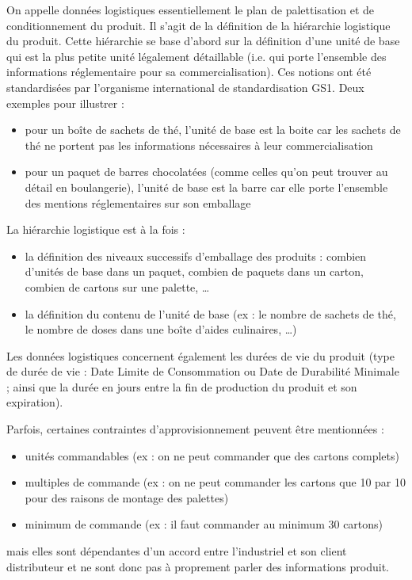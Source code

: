                 On appelle données logistiques essentiellement le plan de palettisation et de conditionnement du produit.
                Il s'agit de la définition de la \og hiérarchie logistique \fg du produit.
                Cette hiérarchie se base d'abord sur la définition d'une \og unité de base \fg qui est la plus petite unité légalement détaillable (i.e. qui porte l'ensemble des informations réglementaire pour sa commercialisation).
                Ces notions ont été standardisées par l'organisme international de standardisation GS1\cite{GDSNimplementationGuide}.
                Deux exemples pour illustrer : 
                \begin{itemize}
                    \item pour un boîte de sachets de thé, l'unité de base est la boite car les sachets de thé ne portent pas les informations nécessaires à leur commercialisation
                    \item pour un paquet de barres chocolatées (comme celles qu'on peut trouver au détail en boulangerie), l'unité de base est la barre car elle porte l'ensemble des mentions réglementaires sur son emballage
                \end{itemize}
                La hiérarchie logistique est à la fois :
                \begin{itemize}
                    \item la définition des niveaux successifs d'emballage des produits  : combien d'unités de base dans un paquet, combien de paquets dans un carton, combien de cartons sur une palette, \dots
                    \item la définition du contenu de l'unité de base (ex : le nombre de sachets de thé, le nombre de doses dans une boîte d'aides culinaires, \dots)
                \end{itemize} 


                Les données logistiques concernent également les durées de vie du produit (type de durée de vie : Date Limite de Consommation ou Date de Durabilité Minimale ; ainsi que la durée en jours entre la fin de production du produit et son expiration).
                
                Parfois, certaines contraintes d'approvisionnement peuvent être mentionnées : 
                \begin{itemize}
                    \item unités commandables (ex : on ne peut commander que des cartons complets)
                    \item multiples de commande (ex : on ne peut commander les cartons que 10 par 10 pour des raisons de montage des palettes)
                    \item minimum de commande (ex : il faut commander au minimum 30 cartons)
                \end{itemize}
                mais elles sont dépendantes d'un accord entre l'industriel et son client distributeur et ne sont donc pas à proprement parler des informations produit.

